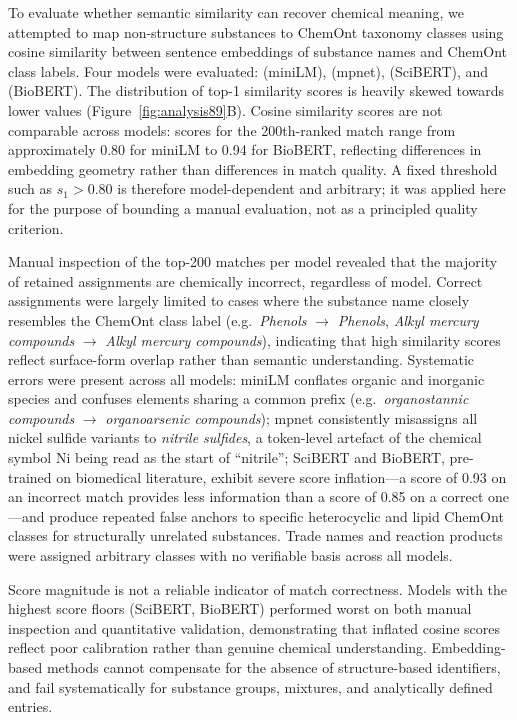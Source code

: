 To evaluate whether semantic similarity can recover chemical meaning, we attempted to map non-structure substances to ChemOnt taxonomy classes using cosine similarity between sentence embeddings of substance names and ChemOnt class labels. Four models were evaluated:  (miniLM),  (mpnet),  (SciBERT), and  (BioBERT). The distribution of top-1 similarity scores is heavily skewed towards lower values (Figure~\ref{fig:analysis89}B). Cosine similarity scores are not comparable across models: scores for the 200th-ranked match range from approximately 0.80 for miniLM to 0.94 for BioBERT, reflecting differences in embedding geometry rather than differences in match quality. A fixed threshold such as $s_1 > 0.80$ is therefore model-dependent and arbitrary; it was applied here for the purpose of bounding a manual evaluation, not as a principled quality criterion.

Manual inspection of the top-200 matches per model revealed that the majority of retained assignments are chemically incorrect, regardless of model. Correct assignments were largely limited to cases where the substance name closely resembles the ChemOnt class label (e.g.\ \textit{Phenols} $\to$ \textit{Phenols}, \textit{Alkyl mercury compounds} $\to$ \textit{Alkyl mercury compounds}), indicating that high similarity scores reflect surface-form overlap rather than semantic understanding. Systematic errors were present across all models: miniLM conflates organic and inorganic species and confuses elements sharing a common prefix (e.g.\ \textit{organostannic compounds} $\to$ \textit{organoarsenic compounds}); mpnet consistently misassigns all nickel sulfide variants to \textit{nitrile sulfides}, a token-level artefact of the chemical symbol Ni being read as the start of ``nitrile''; SciBERT and BioBERT, pre-trained on biomedical literature, exhibit severe score inflation---a score of 0.93 on an incorrect match provides less information than a score of 0.85 on a correct one---and produce repeated false anchors to specific heterocyclic and lipid ChemOnt classes for structurally unrelated substances. Trade names and reaction products were assigned arbitrary classes with no verifiable basis across all models.

Score magnitude is not a reliable indicator of match correctness. Models with the highest score floors (SciBERT, BioBERT) performed worst on both manual inspection and quantitative validation, demonstrating that inflated cosine scores reflect poor calibration rather than genuine chemical understanding. Embedding-based methods cannot compensate for the absence of structure-based identifiers, and fail systematically for substance groups, mixtures, and analytically defined entries.

